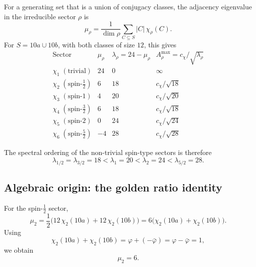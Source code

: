     For a generating set that is a union of conjugacy classes, the adjacency
    eigenvalue in the irreducible sector $\rho$ is
    \begin{equation}
      \mu_\rho
      = \frac{1}{\dim\rho}
      \sum_{C \subseteq S} |C|\,\chi_\rho(C).
      \label{eq:mu-formula-2I}
    \end{equation}
    For $S = 10a \cup 10b$, with both classes of size $12$, this gives
    \begin{equation}
      \renewcommand{\arraystretch}{1.4}
      \begin{array}{l|ccc}
        \text{Sector} &
        \mu_\rho &
        \lambda_\rho = 24 - \mu_\rho &
        A^{\max}_\rho = c_\chi/\sqrt{\lambda_\rho} \\
        \hline
        \chi_1\;(\text{trivial}) & 24 & 0  & \infty \\
        \chi_2\;(\text{spin-}{\tfrac{1}{2}}) & 6  & 18 & c_\chi/\sqrt{18} \\
        \chi_3\;(\text{spin-}1) & 4  & 20 & c_\chi/\sqrt{20} \\
        \chi_4\;(\text{spin-}{\tfrac{3}{2}}) & 6  & 18 & c_\chi/\sqrt{18} \\
        \chi_5\;(\text{spin-}2) & 0  & 24 & c_\chi/\sqrt{24} \\
        \chi_6\;(\text{spin-}{\tfrac{5}{2}}) & -4 & 28 & c_\chi/\sqrt{28}
      \end{array}
      \label{eq:2I-spectrum}
    \end{equation}

    The spectral ordering of the non-trivial spin-type sectors is therefore
    \begin{equation}
      \lambda_{1/2} = \lambda_{3/2} = 18
      < \lambda_1 = 20
      < \lambda_2 = 24
      < \lambda_{5/2} = 28.
      \label{eq:2I-ordering}
    \end{equation}

  \subsection{Algebraic origin: the golden ratio identity}
    \label{sec:step5-golden}

    For the spin-$\tfrac{1}{2}$ sector,
    \begin{equation}
      \mu_2
      = \frac{1}{2}\bigl(12\,\chi_2(10a) + 12\,\chi_2(10b)\bigr)
      = 6\bigl(\chi_2(10a)+\chi_2(10b)\bigr).
      \label{eq:mu2-computation}
    \end{equation}
    Using
    \begin{equation}
      \chi_2(10a)+\chi_2(10b)
      = \varphi + (-\bar\varphi)
      = \varphi - \bar\varphi
      = 1,
      \label{eq:golden-identity}
    \end{equation}
    we obtain
    \begin{equation}
      \mu_2 = 6.
      \label{eq:mu2-final}
    \end{equation}

